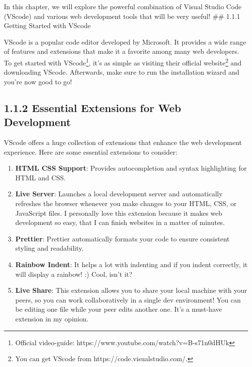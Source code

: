 \documentclass[
  paper=a4,
  ,captions=tableheading
]{scrbook}
\providecommand{\tightlist}{%
  \setlength{\itemsep}{0pt}\setlength{\parskip}{0pt}}
\begin{document}
In this chapter, we will explore the powerful combination of Visual
Studio Code (VScode) and various web development tools that will be very
useful! \#\# 1.1.1 Getting Started with VScode

VScode is a popular code editor developed by Microsoft. It provides a
wide range of features and extensions that make it a favorite among many
web developers. To get started with
VScode\footnote{Official video-guide: https://www.youtube.com/watch?v=B-s71n0dHUk},
it's as simple as visiting their official
website\footnote{You can get VScode from https://code.visualstudio.com/.}
and downloading VScode. Afterwards, make sure to run the installation
wizard and you're now good to go!

\hypertarget{essential-extensions-for-web-development}{%
\subsection{1.1.2 Essential Extensions for Web
Development}\label{essential-extensions-for-web-development}}

VScode offers a huge collection of extensions that enhance the web
development experience. Here are some essential extensions to consider:

\begin{enumerate}
\def\labelenumi{\arabic{enumi}.}
\tightlist
\item
  \textbf{HTML CSS Support}: Provides autocompletion and syntax
  highlighting for HTML and CSS.
\item
  \textbf{Live Server}: Launches a local development server and
  automatically refreshes the browser whenever you make changes to your
  HTML, CSS, or JavaScript files. I personally love this extension
  because it makes web development so easy, that I can finish websites
  in a matter of minutes.
\item
  \textbf{Prettier}: Prettier automatically formats your code to ensure
  consistent styling and readability.
\item
  \textbf{Rainbow Indent}: It helps a lot with indenting and if you
  indent correctly, it will display a rainbow! :) Cool, isn't it?
\item
  \textbf{Live Share}: This extension allows you to share your local
  machine with your peers, so you can work collaboratively in a single
  dev environment! You can be editing one file while your peer edits
  another one. It's a must-have extension in my opinion.
\end{enumerate}
\end{document}
